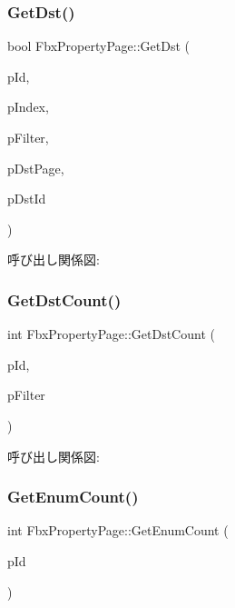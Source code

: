 \subsubsection{\texorpdfstring{Get\+Dst()}{GetDst()}}
{\footnotesize\ttfamily bool Fbx\+Property\+Page\+::\+Get\+Dst (\begin{DoxyParamCaption}\item[{\hyperlink{fbxtypes_8h_a088fa96de3b0b3ea69f0f6afef525dfb}{Fbx\+Int}}]{p\+Id,  }\item[{int}]{p\+Index,  }\item[{\hyperlink{class_fbx_connection_point_filter}{Fbx\+Connection\+Point\+Filter} $\ast$}]{p\+Filter,  }\item[{\hyperlink{class_fbx_property_page}{Fbx\+Property\+Page} $\ast$$\ast$}]{p\+Dst\+Page,  }\item[{\hyperlink{fbxtypes_8h_a088fa96de3b0b3ea69f0f6afef525dfb}{Fbx\+Int} $\ast$}]{p\+Dst\+Id }\end{DoxyParamCaption})}

呼び出し関係図\+:
\mbox{\label{class_fbx_property_page_ac6960f9f9a4d0e29f33d4f338484500a}} 
\subsubsection{\texorpdfstring{Get\+Dst\+Count()}{GetDstCount()}}
{\footnotesize\ttfamily int Fbx\+Property\+Page\+::\+Get\+Dst\+Count (\begin{DoxyParamCaption}\item[{\hyperlink{fbxtypes_8h_a088fa96de3b0b3ea69f0f6afef525dfb}{Fbx\+Int}}]{p\+Id,  }\item[{\hyperlink{class_fbx_connection_point_filter}{Fbx\+Connection\+Point\+Filter} $\ast$}]{p\+Filter }\end{DoxyParamCaption})}

呼び出し関係図\+:
\mbox{\label{class_fbx_property_page_aa1fc02c30ebc9c9e84015b5a98a2a285}} 
\subsubsection{\texorpdfstring{Get\+Enum\+Count()}{GetEnumCount()}}
{\footnotesize\ttfamily int Fbx\+Property\+Page\+::\+Get\+Enum\+Count (\begin{DoxyParamCaption}\item[{\hyperlink{fbxtypes_8h_a088fa96de3b0b3ea69f0f6afef525dfb}{Fbx\+Int}}]{p\+Id }\end{DoxyParamCaption})}

